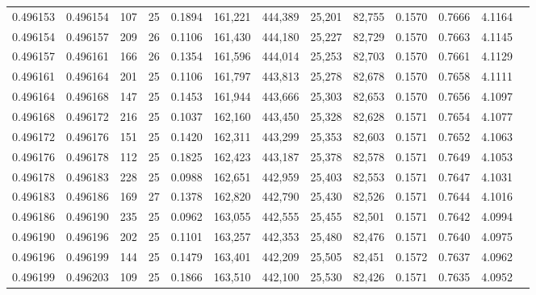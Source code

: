 \begin{tabular}{rrrrrrrrrrrrr}
0.496153 & 0.496154 & 107 &  25 &                                     0.1894 & 161,221 & 444,389 &  25,201 &  82,755 & 0.1570 & 0.7666 & 4.1164 \\
0.496154 & 0.496157 & 209 &  26 &                                     0.1106 & 161,430 & 444,180 &  25,227 &  82,729 & 0.1570 & 0.7663 & 4.1145 \\
0.496157 & 0.496161 & 166 &  26 &                                     0.1354 & 161,596 & 444,014 &  25,253 &  82,703 & 0.1570 & 0.7661 & 4.1129 \\
0.496161 & 0.496164 & 201 &  25 &                                     0.1106 & 161,797 & 443,813 &  25,278 &  82,678 & 0.1570 & 0.7658 & 4.1111 \\
0.496164 & 0.496168 & 147 &  25 &                                     0.1453 & 161,944 & 443,666 &  25,303 &  82,653 & 0.1570 & 0.7656 & 4.1097 \\
0.496168 & 0.496172 & 216 &  25 &                                     0.1037 & 162,160 & 443,450 &  25,328 &  82,628 & 0.1571 & 0.7654 & 4.1077 \\
0.496172 & 0.496176 & 151 &  25 &                                     0.1420 & 162,311 & 443,299 &  25,353 &  82,603 & 0.1571 & 0.7652 & 4.1063 \\
0.496176 & 0.496178 & 112 &  25 &                                     0.1825 & 162,423 & 443,187 &  25,378 &  82,578 & 0.1571 & 0.7649 & 4.1053 \\
0.496178 & 0.496183 & 228 &  25 &                                     0.0988 & 162,651 & 442,959 &  25,403 &  82,553 & 0.1571 & 0.7647 & 4.1031 \\
0.496183 & 0.496186 & 169 &  27 &                                     0.1378 & 162,820 & 442,790 &  25,430 &  82,526 & 0.1571 & 0.7644 & 4.1016 \\
0.496186 & 0.496190 & 235 &  25 &                                     0.0962 & 163,055 & 442,555 &  25,455 &  82,501 & 0.1571 & 0.7642 & 4.0994 \\
0.496190 & 0.496196 & 202 &  25 &                                     0.1101 & 163,257 & 442,353 &  25,480 &  82,476 & 0.1571 & 0.7640 & 4.0975 \\
0.496196 & 0.496199 & 144 &  25 &                                     0.1479 & 163,401 & 442,209 &  25,505 &  82,451 & 0.1572 & 0.7637 & 4.0962 \\
0.496199 & 0.496203 & 109 &  25 &                                     0.1866 & 163,510 & 442,100 &  25,530 &  82,426 & 0.1571 & 0.7635 & 4.0952 \\

\end{tabular}
